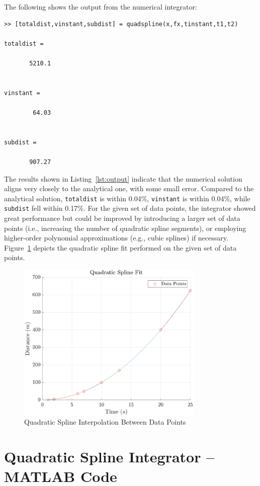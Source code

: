 \documentclass{article}
\newcommand{\mat}[1]{\lstinline[style=matlabstyle]|#1|}
\begin{document}
The following shows the output from the numerical integrator:
\begin{lstlisting}[style=matlabstyle, caption = {Integrator Output},numbers=none, label={lst:output}]
>> [totaldist,vinstant,subdist] = quadspline(x,fx,tinstant,t1,t2)

totaldist =

       5210.1


vinstant =

        64.03


subdist =

       907.27
\end{lstlisting}

The results shown in Listing~\ref{lst:output} indicate that the numerical solution aligns very closely to the analytical one, with some small error. Compared to the analytical solution, \mat{totaldist} is within 0.04\%, \mat{vinstant} is within 0.04\%, while \mat{subdist} fell within 0.17\%. For the given set of data points, the integrator showed great performance but could be improved by introducing a larger set of data points (i.e., increasing the number of quadratic spline segments), or employing higher-order polynomial approximations (e.g., cubic splines) if necessary.\\

Figure~\ref{fig:fig1} depicts the quadratic spline fit performed on the given set of data points.

\pagebreak

\begin{figure}[h]
    \centering
    \includegraphics[width=0.8\textwidth]{fig/quadSplineFit.png}
    \caption{Quadratic Spline Interpolation Between Data Points}
    \label{fig:fig1}
\end{figure}

\pagebreak

\section{Quadratic Spline Integrator -- MATLAB Code}


\end{document}
